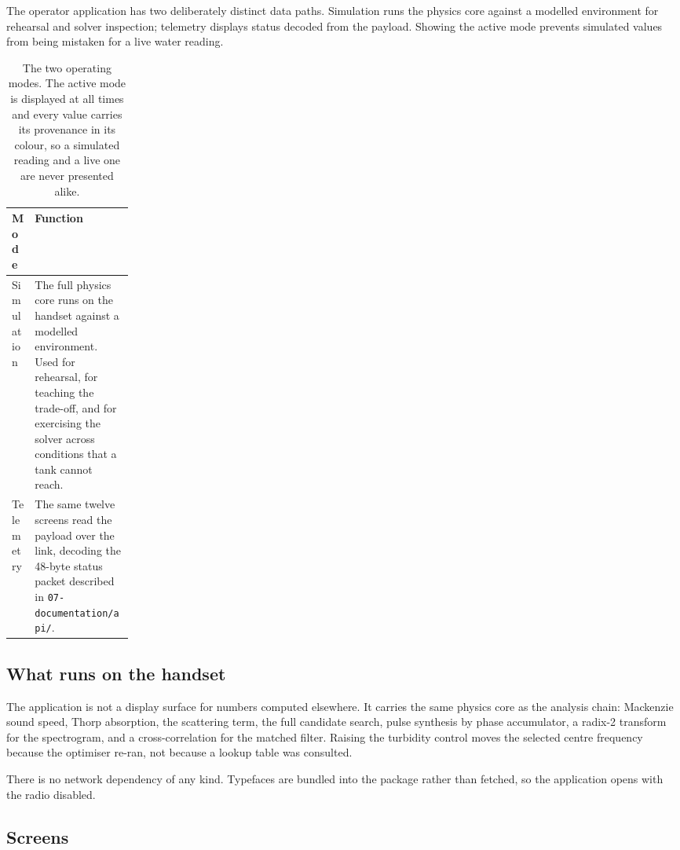 \documentclass[conference,a4paper]{IEEEtran}
\begin{document}
The operator application has two deliberately distinct data paths. Simulation
runs the physics core against a modelled environment for rehearsal and solver
inspection; telemetry displays status decoded from the payload. Showing the
active mode prevents simulated values from being mistaken for a live water
reading.

\begin{table}[t]
\centering
\small
\begin{tabularx}{\linewidth}{L{0.18\linewidth}Y}
\toprule
\textbf{Mode} & \textbf{Function} \\
\midrule
Simulation & The full physics core runs on the handset against a modelled
             environment. Used for rehearsal, for teaching the trade-off, and
             for exercising the solver across conditions that a tank cannot
             reach. \\
Telemetry & The same twelve screens read the payload over the link, decoding
            the 48-byte status packet described in
            \texttt{07-documentation/api/}. \\
\bottomrule
\end{tabularx}
\caption{The two operating modes. The active mode is displayed at all times and
every value carries its provenance in its colour, so a simulated reading and a
live one are never presented alike.}
\label{tab:modes}
\end{table}

\subsection{What runs on the handset}

The application is not a display surface for numbers computed elsewhere. It
carries the same physics core as the analysis chain: Mackenzie sound speed,
Thorp absorption, the scattering term, the full candidate search, pulse
synthesis by phase accumulator, a radix-2 transform for the spectrogram, and a
cross-correlation for the matched filter. Raising the turbidity control moves
the selected centre frequency because the optimiser re-ran, not because a
lookup table was consulted.

There is no network dependency of any kind. Typefaces are bundled into the
package rather than fetched, so the application opens with the radio disabled.

\subsection{Screens}
\end{document}
